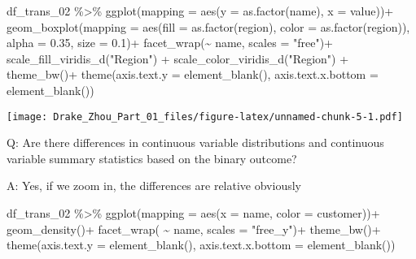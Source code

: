 \documentclass[
]{article}
\newenvironment{Shaded}{\begin{snugshade}}{\end{snugshade}}
\newcommand{\AttributeTok}[1]{\textcolor[rgb]{0.77,0.63,0.00}{#1}}
\newcommand{\FloatTok}[1]{\textcolor[rgb]{0.00,0.00,0.81}{#1}}
\newcommand{\FunctionTok}[1]{\textcolor[rgb]{0.00,0.00,0.00}{#1}}
\newcommand{\NormalTok}[1]{#1}
\newcommand{\SpecialCharTok}[1]{\textcolor[rgb]{0.00,0.00,0.00}{#1}}
\newcommand{\StringTok}[1]{\textcolor[rgb]{0.31,0.60,0.02}{#1}}
\begin{document}
\begin{Shaded}
\begin{Highlighting}[]
\NormalTok{df\_trans\_02 }\SpecialCharTok{\%\textgreater{}\%}
  \FunctionTok{ggplot}\NormalTok{(}\AttributeTok{mapping =} \FunctionTok{aes}\NormalTok{(}\AttributeTok{y =} \FunctionTok{as.factor}\NormalTok{(name), }\AttributeTok{x =}\NormalTok{ value))}\SpecialCharTok{+}
  \FunctionTok{geom\_boxplot}\NormalTok{(}\AttributeTok{mapping =} \FunctionTok{aes}\NormalTok{(}\AttributeTok{fill =} \FunctionTok{as.factor}\NormalTok{(region), }\AttributeTok{color =} \FunctionTok{as.factor}\NormalTok{(region)),}
               \AttributeTok{alpha =} \FloatTok{0.35}\NormalTok{, }\AttributeTok{size =} \FloatTok{0.1}\NormalTok{)}\SpecialCharTok{+}
  \FunctionTok{facet\_wrap}\NormalTok{(}\SpecialCharTok{\textasciitilde{}}\NormalTok{ name, }\AttributeTok{scales =} \StringTok{"free"}\NormalTok{)}\SpecialCharTok{+}
  \FunctionTok{scale\_fill\_viridis\_d}\NormalTok{(}\StringTok{"Region"}\NormalTok{) }\SpecialCharTok{+}
  \FunctionTok{scale\_color\_viridis\_d}\NormalTok{(}\StringTok{"Region"}\NormalTok{) }\SpecialCharTok{+}
  \FunctionTok{theme\_bw}\NormalTok{()}\SpecialCharTok{+}
  \FunctionTok{theme}\NormalTok{(}\AttributeTok{axis.text.y =} \FunctionTok{element\_blank}\NormalTok{(), }\AttributeTok{axis.text.x.bottom =} \FunctionTok{element\_blank}\NormalTok{())}
\end{Highlighting}
\end{Shaded}

\texttt{[image: Drake\_Zhou\_Part\_01\_files/figure-latex/unnamed-chunk-5-1.pdf]}

Q: Are there differences in continuous variable distributions and
continuous variable summary statistics based on the binary outcome?

A: Yes, if we zoom in, the differences are relative obviously

\begin{Shaded}
\begin{Highlighting}[]
\NormalTok{df\_trans\_02 }\SpecialCharTok{\%\textgreater{}\%} 
  \FunctionTok{ggplot}\NormalTok{(}\AttributeTok{mapping =} \FunctionTok{aes}\NormalTok{(}\AttributeTok{x =}\NormalTok{ name, }\AttributeTok{color =}\NormalTok{ customer))}\SpecialCharTok{+}
  \FunctionTok{geom\_density}\NormalTok{()}\SpecialCharTok{+}
  \FunctionTok{facet\_wrap}\NormalTok{( }\SpecialCharTok{\textasciitilde{}}\NormalTok{ name, }\AttributeTok{scales =} \StringTok{"free\_y"}\NormalTok{)}\SpecialCharTok{+}
  \FunctionTok{theme\_bw}\NormalTok{()}\SpecialCharTok{+}
  \FunctionTok{theme}\NormalTok{(}\AttributeTok{axis.text.y =} \FunctionTok{element\_blank}\NormalTok{(), }\AttributeTok{axis.text.x.bottom =} \FunctionTok{element\_blank}\NormalTok{())}
\end{Highlighting}
\end{Shaded}
\end{document}

